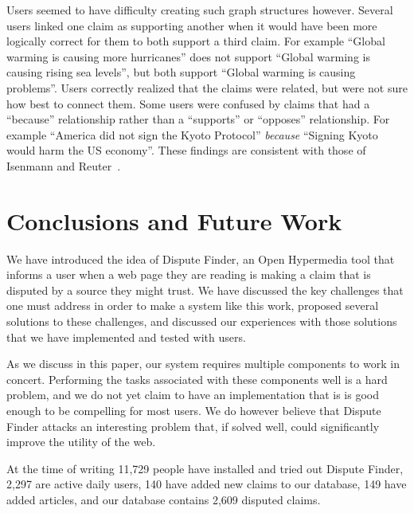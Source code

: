 \documentclass{www2010-submission}
\newcommand{\todo}[1]{}
\begin{document}
Users seemed to have difficulty creating such graph structures however. Several users linked one claim as supporting another when it would have been more logically correct for them to both support a third claim. For example ``Global warming is causing more hurricanes'' does not support ``Global warming is causing rising sea levels'', but both support ``Global warming is causing problems''. Users correctly realized that the claims were related, but were not sure how best to connect them. Some users were confused by claims that had a ``because'' relationship rather than a ``supports'' or ``opposes'' relationship. For example ``America did not sign the Kyoto Protocol'' {\it because} ``Signing Kyoto would harm the US economy''. These findings are consistent with those of Isenmann and Reuter~\cite{Isenmann1997}.




\todo{Need to say that the argumentation graph contains all existing claims and that it was a simple ``supports"/``opposes'' graph.}

\todo{Come up with terminology for marking an evidence snippet, and agree on evidence vs source vs article}
\todo{Talk about how the early versions conflated evidence and snippets - and whether it makes sense to distinguish between them}
\todo{Screenshot of the claim graph interface}


\section{Conclusions and Future Work}

We have introduced the idea of Dispute Finder, an Open Hypermedia tool that informs a user when a web page they are reading is making a claim that is disputed by a source they might trust. We have discussed the key challenges that one must address in order to make a system like this work, proposed several solutions to these challenges, and discussed our experiences with those solutions that we have implemented and tested with users.

As we discuss in this paper, our system requires multiple components to work in concert. Performing the tasks associated with these components well is a hard problem, and we do not yet claim to have an implementation that is is good enough to be compelling for most users. We do however believe that Dispute Finder attacks an interesting problem that, if solved well, could significantly improve the utility of the web.

At the time of writing 11,729 people have installed and tried out Dispute Finder, 2,297 are active daily users, 140 have added new claims to our database, 149 have added articles, and our database contains 2,609 disputed claims. 
\end{document}
